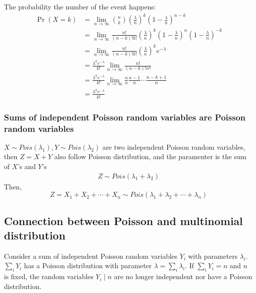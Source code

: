 \documentclass[11pt]{elegantbook}
\begin{document}
The probability the number of the event happens:
\begin{equation}
    \begin{aligned}
        \Pr(X=k)&=\lim_{n \rightarrow\infty} \binom{n}{k} (\frac{\lambda}{n})^k(1-\frac{\lambda}{n})^{n-k}\\
        &=\lim_{n \rightarrow\infty} \frac{n!}{(n-k)!k!} (\frac{\lambda}{n})^k(1-\frac{\lambda}{n})^{n}(1-\frac{\lambda}{n})^{-k}\\
        &=\lim_{n \rightarrow\infty}\frac{n!}{(n-k)!k!} (\frac{\lambda}{n})^k e^{-\lambda}\\
        &=\frac{\lambda^k e^{-\lambda}}{k!}\lim_{n \rightarrow\infty}\frac{n!}{(n-k)!n^k}\\
        &=\frac{\lambda^k e^{-\lambda}}{k!}\lim_{n \rightarrow\infty}
        \frac{n}{n}\frac{n-1}{n}\cdots \frac{n-k+1}{n}\\
        &=\frac{\lambda^k e^{-\lambda}}{k!}
    \end{aligned}
    \nonumber
\end{equation}

\subsubsection*{Sums of independent Poisson random variables are Poisson random variables}
$X\sim Pois(\lambda_1), Y\sim Pois(\lambda_2)$ are two independent Poisson random variables, then $Z=X+Y$ also follow Poisson distribution, and the paramenter is the sum of $X$'s and $Y$'s
\begin{equation}
    \begin{aligned}
        Z\sim Pois(\lambda_1+\lambda_2)
    \end{aligned}
    \nonumber
\end{equation}
Then, $$Z=X_1+X_2+\cdots+X_n\sim Pois(\lambda_1+\lambda_2+\cdots+\lambda_n)$$

\subsection{Connection between Poisson and multinomial distribution}
Consider a sum of independent Poisson random variables $Y_i$ with parameters $\lambda_i$. $\sum_i Y_i$ has a Poisson distribution with parameter $\lambda=\sum_i \lambda_i$. If $\sum_i Y_i=n$ and $n$ is fixed, the random variables $Y_i\mid n$ are no longer independent nor have a Poisson distribution.
\end{document}
